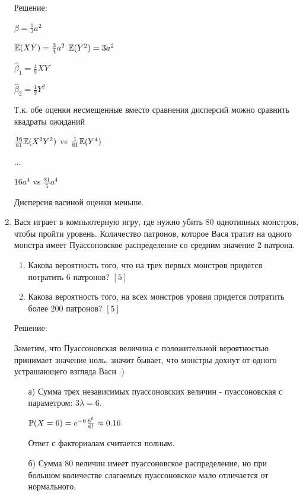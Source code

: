\documentclass[12pt, a4paper]{article}\usepackage[]{graphicx}\usepackage[]{color}
\begin{document}
\begin{enumerate}
Решение:

$\beta=\frac{1}{3}a^{2}$

$\E(XY)=\frac{3}{4}a^{2}$
$\E(Y^{2})=3a^{2}$

$\hat{\beta}_{1}=\frac{4}{9}XY$

$\hat{\beta}_{2}=\frac{1}{9}Y^{2}$

Т.к. обе оценки несмещенные вместо сравнения дисперсий можно сравнить квадраты ожиданий

$\frac{16}{81}\E(X^{2}Y^{2})$ vs $\frac{1}{81}\E(Y^{4})$

...

$16 a^4$ vs $\frac{81}{5} a^{4}$

Дисперсия васиной оценки меньше.


\item Вася играет в компьютерную игру, где нужно убить 80 однотипных монстров, чтобы пройти уровень. Количество патронов, которое Вася тратит на одного монстра имеет Пуассоновское распределение со средним значение 2 патрона.
\begin{enumerate}
\item Какова вероятность того, что на трех первых монстров придется потратить 6 патронов? $[5]$
\item Какова вероятность того, на всех монстров уровня придется потратить более 200 патронов? $[5]$
\end{enumerate}

Решение:

Заметим, что Пуассоновская величина с положительной вероятностью принимает значение ноль, значит бывает, что монстры дохнут от одного устрашающего взгляда Васи :)
\begin{enumerate}
\item[а)] Сумма трех независимых пуассоновских величин - пуассоновская с параметром: $3\lambda=6$.

$\P(X=6)=e^{-6}\frac{6^6}{6!}\approx 0.16$

Ответ с факториалам считается полным.
\item[б)] Сумма 80 величин имеет пуассоновское распределение, но при большом количестве слагаемых пуассоновское мало отличается от нормального.


\end{enumerate}
\end{enumerate}
\end{document}
